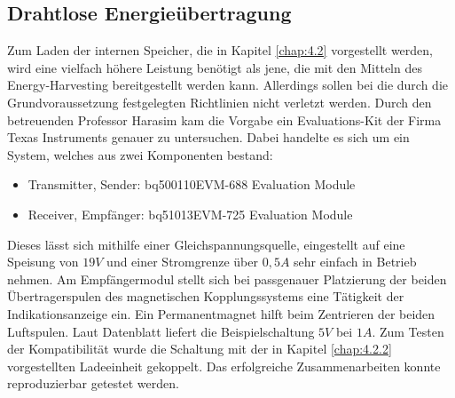\documentclass[12pt]{scrreprt} %
\begin{document}
\subsection{Drahtlose Energieübertragung}
\label{chap:4.1.2}
Zum Laden der internen Speicher, die in Kapitel \vref{chap:4.2} vorgestellt werden, wird eine vielfach höhere Leistung benötigt als jene, die mit den Mitteln des Energy-Harvesting bereitgestellt werden kann. Allerdings sollen bei die durch die Grundvoraussetzung festgelegten Richtlinien nicht verletzt werden. Durch den betreuenden Professor Harasim kam die Vorgabe ein Evaluations-Kit der Firma Texas Instruments genauer zu untersuchen. Dabei handelte es sich um ein System, welches aus zwei Komponenten bestand:
\begin{itemize}
\item
Transmitter, Sender: bq500110EVM-688 Evaluation Module
\item
Receiver, Empfänger: bq51013EVM-725 Evaluation Module
\end{itemize}
Dieses lässt sich mithilfe einer Gleichspannungsquelle, eingestellt auf eine Speisung von $19V$ und einer Stromgrenze über $0,5A$ sehr einfach in Betrieb nehmen. Am Empfängermodul stellt sich bei passgenauer Platzierung der beiden Übertragerspulen des magnetischen Kopplungssystems eine Tätigkeit der Indikationsanzeige ein. Ein Permanentmagnet hilft beim Zentrieren der beiden Luftspulen. Laut Datenblatt \citep[vgl. S.2]{bq51013EVM-725} liefert die Beispielschaltung $5V$ bei $1A$. Zum Testen der Kompatibilität wurde die Schaltung mit der in Kapitel \ref{chap:4.2.2} vorgestellten Ladeeinheit gekoppelt. Das erfolgreiche Zusammenarbeiten konnte reproduzierbar getestet werden.\\
\end{document}
